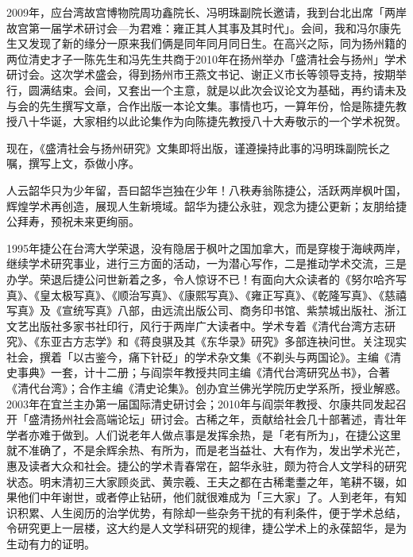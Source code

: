 2009年，应台湾故宫博物院周功鑫院长、冯明珠副院长邀请，我到台北出席「两岸故宫第一届学术研讨会—为君难：雍正其人其事及其时代」。会间，我和冯尔康先生又发现了新的缘分一原来我们俩是同年同月同日生。在高兴之际，同为扬州籍的两位清史才子一陈先生和冯先生共商于2010年在扬州举办「盛清社会与扬州」学术研讨会。这次学术盛会，得到扬州市王燕文书记、谢正义市长等领导支持，按期举行，圆满结束。会间，又套出一个主意，就是以此次会议论文为基础，再约请未及与会的先生撰写文章，合作出版一本论文集。事情也巧，一算年份，恰是陈捷先教授八十华诞，大家相约以此论集作为向陈捷先教授八十大寿敬示的一个学术祝贺。

现在，《盛清社会与扬州研究》文集即将出版，谨遵操持此事的冯明珠副院长之嘱，撰写上文，忝做小序。



人云韶华只为少年留，吾曰韶华岂独在少年！八秩寿翁陈捷公，活跃两岸枫叶国，辉煌学术再创造，展现人生新境域。韶华为捷公永驻，观念为捷公更新；友朋给捷公拜寿，预祝未来更绚丽。

1995年捷公在台湾大学荣退，没有隐居于枫叶之国加拿大，而是穿梭于海峡两岸，继续学术研究事业，进行三方面的活动，一为潜心写作，二是推动学术交流，三是办学。荣退后捷公问世新着之多，令人惊讶不已！有面向大众读者的《努尔哈齐写真》、《皇太极写真》、《顺治写真》、《康熙写真》、《雍正写真》、《乾隆写真》、《慈禧写真》及《宣统写真》八部，由远流出版公司、商务印书馆、紫禁城出版社、浙江文艺出版社多家书社印行，风行于两岸广大读者中。学术专着《清代台湾方志研究》、《东亚古方志学》和《蒋良骐及其《东华录》研究》多部连袂问世。关注现实社会，撰着「以古鉴今，痛下针砭」的学术杂文集《不剃头与两国论》。主编《清史事典》一套，计十二册；与阎崇年教授共同主编《清代台湾研究丛书》，合著《清代台湾》；合作主编《清史论集》。创办宜兰佛光学院历史学系所，授业解惑。2003年在宜兰主办第一届国际清史研讨会；2010年与阎崇年教授、尔康共同发起召开「盛清扬州社会高端论坛」研讨会。古稀之年，贡献给社会几十部著述，青壮年学者亦难于做到。人们说老年人做点事是发挥余热，是「老有所为」，在捷公这里就不准确了，不是余辉余热、有所为，而是老当益壮、大有作为，发出学术光芒，惠及读者大众和社会。捷公的学术青春常在，韶华永驻，颇为符合人文学科的研究状态。明末清初三大家顾炎武、黄宗羲、王夫之都在古稀耄耋之年，笔耕不辍，如果他们中年谢世，或者停止钻研，他们就很难成为「三大家」了。人到老年，有知识积累、人生阅历的治学优势，有除却一些杂务干扰的有利条件，便于学术总结，令研究更上一层楼，这大约是人文学科研究的规律，捷公学术上的永葆韶华，是为生动有力的证明。



